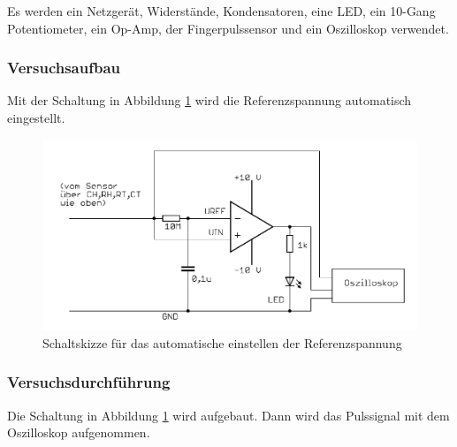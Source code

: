 \documentclass[12pt,a4paper]{article}
\begin{document}
Es werden ein Netzgerät, Widerstände, Kondensatoren, eine LED, ein 10-Gang Potentiometer, ein Op-Amp, der Fingerpulssensor und ein Oszilloskop verwendet.

\subsubsection*{Versuchsaufbau}

Mit der Schaltung in Abbildung \ref{fig:auf_5} wird die Referenzspannung automatisch eingestellt.

\begin{figure}[H] 
	\centering
	\includegraphics[scale = 0.3]{auf_5.png}
	\caption[Schaltskizze für das automatische einstellen der Referenzspannung]{Schaltskizze für das automatische einstellen der Referenzspannung\footnotemark}
	\label{fig:auf_5}
\end{figure}

\subsubsection*{Versuchsdurchführung}

Die Schaltung in Abbildung \ref{fig:auf_5} wird aufgebaut. Dann wird das Pulssignal mit dem Oszilloskop aufgenommen.
\end{document}

